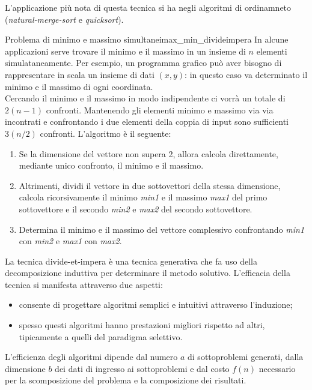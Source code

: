 \documentclass[12pt]{report}
\newcommand{\nmu}{}
\begin{document}
 	L'applicazione più nota di questa tecnica si ha negli algoritmi di ordinamneto (\textit{natural-merge-sort} e \textit{quicksort}).
 	\begin{example}{\nmu Problema di minimo e massimo simultanei}{max_min_divideimpera}
 		In alcune applicazioni serve trovare il minimo e il massimo in un insieme di $n$ elementi simulataneamente. Per esempio, un programma grafico può aver bisogno di rappresentare in scala un insieme di dati $(x, y)$: in questo caso va determinato il minimo e il massimo di ogni coordinata.\\
 		Cercando il minimo e il massimo in modo indipendente ci vorrà un totale di $2(n-1)$ confronti. Mantenendo gli elementi minimo e massimo via via incontrati e confrontando i due elementi della coppia di input sono sufficienti $3(n/2)$ confronti. L'algoritmo è il seguente:
 		\begin{enumerate}
 			\item Se la dimensione del vettore non supera 2, allora calcola direttamente, mediante unico confronto, il minimo e il massimo.
 			\item Altrimenti, dividi il vettore in due sottovettori della stessa dimensione, calcola ricorsivamente il minimo \textit{min1}  e il massimo \textit{max1} del primo sottovettore e il secondo \textit{min2} e \textit{max2} del secondo sottovettore.
 			\item Determina il minimo e il massimo del vettore complessivo confrontando \textit{min1} con \textit{min2} e \textit{max1} con \textit{max2}.
 		\end{enumerate}
 	\end{example}
 	La tecnica divide-et-impera è una tecnica generativa che fa uso della decomposizione induttiva per determinare il metodo solutivo. L'efficacia della tecnica si manifesta attraverso due aspetti:
 	\begin{itemize}
 		\item consente di progettare algoritmi semplici e intuitivi attraverso l'induzione;
 		\item spesso questi algoritmi hanno prestazioni migliori rispetto ad altri, tipicamente a quelli del paradigma selettivo.
 	\end{itemize}
 	L'efficienza degli algoritmi dipende dal numero $a$ di sottoproblemi generati, dalla dimensione $b$ dei dati di ingresso ai sottoproblemi e dal costo $f(n)$ necessario per la scomposizione del problema e la composizione dei risultati.
 
\end{document}
